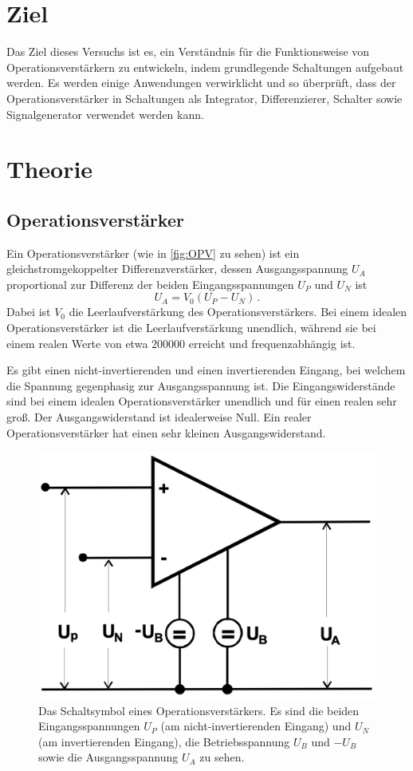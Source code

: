 \section{Ziel}
Das Ziel dieses Versuchs ist es, ein Verständnis für die Funktionsweise von Operationsverstärkern zu entwickeln, indem grundlegende Schaltungen aufgebaut werden.
Es werden einige Anwendungen verwirklicht und so überprüft, dass der Operationsverstärker in Schaltungen als Integrator, Differenzierer, Schalter sowie Signalgenerator verwendet werden kann.


\section{Theorie}

\subsection{Operationsverstärker}
Ein Operationsverstärker (wie in \autoref{fig:OPV} zu sehen) ist ein gleichstromgekoppelter Differenzverstärker, dessen Ausgangsspannung $U_A$ proportional zur Differenz der beiden Eingangsspannungen $U_P$ und $U_N$ ist
\begin{equation*}
    U_A = V_0 (U_P - U_N) \, .
\end{equation*}
Dabei ist $V_0$ die Leerlaufverstärkung des Operationsverstärkers. Bei einem idealen Operationsverstärker ist die Leerlaufverstärkung unendlich, während sie bei einem realen Werte von etwa $\num{200000}$ erreicht und frequenzabhängig ist. %

Es gibt einen nicht-invertierenden und einen invertierenden Eingang, bei welchem die Spannung gegenphasig zur Ausgangsspannung ist. Die Eingangswiderstände sind bei einem idealen Operationsverstärker unendlich und für einen realen sehr groß. Der Ausgangswiderstand ist idealerweise Null. Ein realer Operationsverstärker hat einen sehr kleinen Ausgangswiderstand.

\begin{figure}
    \centering
    \includegraphics[width=0.5\linewidth]{./figures/OPV.png}
    \caption{Das Schaltsymbol eines Operationsverstärkers. Es sind die beiden Eingangsspannungen $U_P$ (am nicht-invertierenden Eingang) und $U_N$ (am invertierenden Eingang), die Betriebsspannung $U_B$ und $-U_B$ sowie die Ausgangsspannung $U_A$ zu sehen.}
    \label{fig:OPV}
\end{figure}

